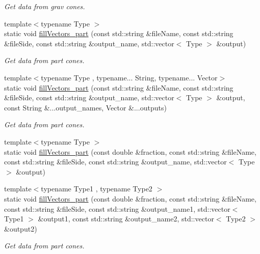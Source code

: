 \begin{DoxyCompactItemize}
\begin{DoxyCompactList}\small\item\em Get data from grav cones. \end{DoxyCompactList}\item 
{\footnotesize template$<$typename Type $>$ }\\static void \hyperlink{classTReadHDF5_a0d90131976f57e7dd159e1e003e43848}{fill\-Vectors\-\_\-part} (const std\-::string \&file\-Name, const std\-::string \&file\-Side, const std\-::string \&output\-\_\-name, std\-::vector$<$ Type $>$ \&output)
\begin{DoxyCompactList}\small\item\em Get data from part cones. \end{DoxyCompactList}\item 
{\footnotesize template$<$typename Type , typename... String, typename... Vector$>$ }\\static void \hyperlink{classTReadHDF5_adad8a4900612bac2a049f5c701e7e427}{fill\-Vectors\-\_\-part} (const std\-::string \&file\-Name, const std\-::string \&file\-Side, const std\-::string \&output\-\_\-name, std\-::vector$<$ Type $>$ \&output, const String \&...output\-\_\-names, Vector \&...outputs)
\begin{DoxyCompactList}\small\item\em Get data from part cones. \end{DoxyCompactList}\item 
{\footnotesize template$<$typename Type $>$ }\\static void \hyperlink{classTReadHDF5_aa2a7c1c5a047f44ea424f94d60f1a442}{fill\-Vectors\-\_\-part} (const double \&fraction, const std\-::string \&file\-Name, const std\-::string \&file\-Side, const std\-::string \&output\-\_\-name, std\-::vector$<$ Type $>$ \&output)
\item 
{\footnotesize template$<$typename Type1 , typename Type2 $>$ }\\static void \hyperlink{classTReadHDF5_ae177f1bddfeb46b09115bf6d9a7bbc7e}{fill\-Vectors\-\_\-part} (const double \&fraction, const std\-::string \&file\-Name, const std\-::string \&file\-Side, const std\-::string \&output\-\_\-name1, std\-::vector$<$ Type1 $>$ \&output1, const std\-::string \&output\-\_\-name2, std\-::vector$<$ Type2 $>$ \&output2)
\begin{DoxyCompactList}\small\item\em Get data from part cones. \end{DoxyCompactList}\item 

\end{DoxyCompactItemize}
